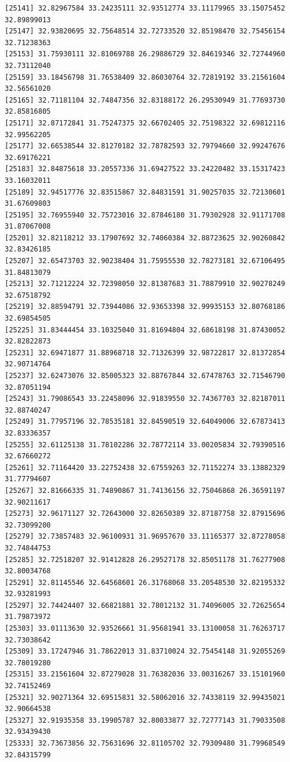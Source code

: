 \documentclass[
  letterpaper,
  DIV=11,
  numbers=noendperiod]{scrartcl}
\begin{document}
\begin{verbatim}
[25141] 32.82967584 33.24235111 32.93512774 33.11179965 33.15075452 32.89899013
[25147] 32.93820695 32.75648514 32.72733520 32.85198470 32.75456154 32.71238363
[25153] 31.75930111 32.81069788 26.29886729 32.84619346 32.72744960 32.73112040
[25159] 33.18456798 31.76538409 32.86030764 32.72819192 33.21561604 32.56561020
[25165] 32.71181104 32.74847356 32.83188172 26.29530949 31.77693730 32.85816805
[25171] 32.87172841 31.75247375 32.66702405 32.75198322 32.69812116 32.99562205
[25177] 32.66538544 32.81270182 32.78782593 32.79794660 32.99247676 32.69176221
[25183] 32.84875618 33.20557336 31.69427522 33.24220482 33.15317423 33.16032011
[25189] 32.94517776 32.83515867 32.84831591 31.90257035 32.72130601 31.67609803
[25195] 32.76955940 32.75723016 32.87846180 31.79302928 32.91171708 31.87067008
[25201] 32.82118212 33.17907692 32.74060384 32.88723625 32.90260842 32.83426185
[25207] 32.65473703 32.90238404 31.75955530 32.78273181 32.67106495 31.84813079
[25213] 32.71212224 32.72398050 32.81387683 31.78879910 32.90278249 32.67518792
[25219] 32.88594791 32.73944086 32.93653398 32.99935153 32.80768186 32.69854505
[25225] 31.83444454 33.10325040 31.81694804 32.68618198 31.87430052 32.82822873
[25231] 32.69471877 31.88968718 32.71326399 32.98722817 32.81372854 32.90714764
[25237] 32.62473076 32.85005323 32.88767844 32.67478763 32.71546790 32.87051194
[25243] 31.79086543 33.22458096 32.91839550 32.74367703 32.82187011 32.88740247
[25249] 31.77957196 32.78535181 32.84590519 32.64049006 32.67873413 32.83336357
[25255] 32.61125138 31.78102286 32.78772114 33.00205834 32.79390516 32.67660272
[25261] 32.71164420 33.22752438 32.67559263 32.71152274 33.13882329 31.77794607
[25267] 32.81666335 31.74890867 31.74136156 32.75046868 26.36591197 32.90211617
[25273] 32.96171127 32.72643000 32.82650389 32.87187758 32.87915696 32.73099200
[25279] 32.73857483 32.96100931 31.96957670 33.11165377 32.87278058 32.74844753
[25285] 32.72518207 32.91412828 26.29527178 32.85051178 31.76277908 32.80034768
[25291] 32.81145546 32.64568601 26.31768068 33.20548530 32.82195332 32.93281993
[25297] 32.74424407 32.66821881 32.78012132 31.74096005 32.72625654 31.79873972
[25303] 33.01113630 32.93526661 31.95681941 33.13100058 31.76263717 32.73038642
[25309] 33.17247946 31.78622013 31.83710024 32.75454148 31.92055269 32.78019280
[25315] 33.21561604 32.87279028 31.76382036 33.00316267 33.15101960 32.74152469
[25321] 32.90271364 32.69515831 32.58062016 32.74338119 32.99435021 32.90664538
[25327] 32.91935358 33.19905787 32.80033877 32.72777143 31.79033508 32.93439430
[25333] 32.73673856 32.75631696 32.81105702 32.79309480 31.79968549 32.84315799

\end{verbatim}
\end{document}
